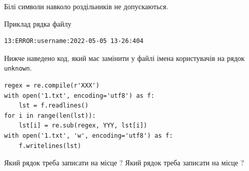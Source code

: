 \documentclass[12pt, ukrainian]{article}
\def\code#1{\Verb!#1!}
\begin{document}
{Білі символи навколо роздільників не допускаються.

Приклад рядка файлу



\begin{verbatim}
13:ERROR:username:2022-05-05 13-26:404
\end{verbatim}


Нижче наведено код, який має замінити у файлі імена користувачів на рядок \code{unknown}.



\begin{verbatim}
regex = re.compile(r'XXX')
with open('1.txt', encoding='utf8') as f:
    lst = f.readlines()
for i in range(len(lst)):
    lst[i] = re.sub(regex, YYY, lst[i])
with open('1.txt', 'w', encoding='utf8') as f:
    f.writelines(lst)
\end{verbatim}





Який рядок треба записати на місце  ?
Який рядок треба записати на місце  ?\par

}
\newpage
\end{document}

